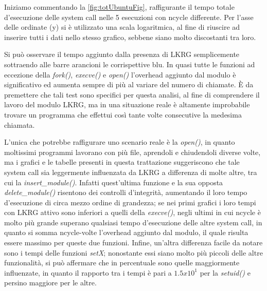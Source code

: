 Iniziamo commentando la \autoref{fig:totUbuntuFig}, raffigurante il tempo totale d'esecuzione delle system call nelle 5 esecuzioni con ncycle differente. Per l'asse delle ordinate (y) si è utilizzato una scala logaritmica, al fine di riuscire ad inserire tutti i dati nello stesso grafico, sebbene siano molto discostanti tra loro.

Si può osservare il tempo aggiunto dalla presenza di LKRG semplicemente sottraendo alle barre arancioni le corrispettive blu. In quasi tutte le funzioni ad eccezione della \emph{fork()}, \emph{execve()} e \emph{open()} l'overhead aggiunto dal modulo è significativo ed aumenta sempre di più al variare del numero di chiamate. È da premettere che tali test sono specifici per questa analisi, al fine di comprendere il lavoro del modulo LKRG, ma in una situazione reale è altamente improbabile trovare un programma che effettui così tante volte consecutive la medesima chiamata.

L'unica che potrebbe raffigurare uno scenario reale è la \emph{open()}, in quanto moltissimi programmi lavorano con più file, aprendoli e chiudendoli diverse volte, ma i grafici e le tabelle presenti in questa trattazione suggeriscono che tale system call sia leggermente influenzata da LKRG a differenza di molte altre, tra cui la \emph{insert\_module()}. Infatti quest'ultima funzione e la sua opposta \emph{delete\_module()} risentono dei controlli d'integrità, aumentando il loro tempo d'esecuzione di circa mezzo ordine di grandezza; se nei primi grafici i loro tempi con LKRG attivo sono inferiori a quelli della \emph{execve()}, negli ultimi in cui ncycle è molto più grande superano qualsiasi tempo d'esecuzione delle altre system call, in quanto si somma ncycle-volte l'overhead aggiunto dal modulo, il quale risulta essere massimo per queste due funzioni. Infine, un'altra differenza facile da notare sono i tempi delle funzioni \emph{setX}; nonostante essi siano molto più piccoli delle altre funzionalità, si può affermare che in percentuale sono quelle maggiormente influenzate, in quanto il rapporto tra i tempi è pari a $1.5x10^{1}$ per la \emph{setuid()} e persino maggiore per le altre.

